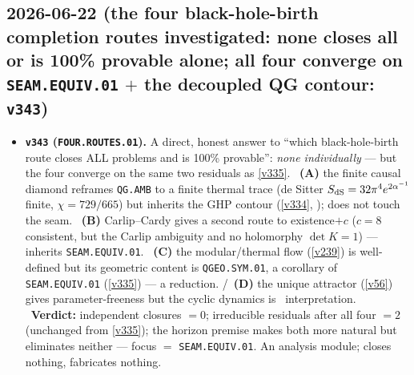 \subsection*{2026-06-22 (the four black-hole-birth completion routes investigated: none closes all or is 100\% provable alone; all four converge on \texttt{SEAM.EQUIV.01} $+$ the decoupled QG contour: \texttt{v343})}
\begin{itemize}
\item \textbf{\texttt{v343} (\texttt{FOUR.ROUTES.01}).} A direct, honest answer to ``which black-hole-birth route
closes ALL problems and is 100\% provable'': \emph{none individually} --- but the four converge on the same two
residuals as \vref{v335}. \mE\ \textbf{(A)} the finite causal diamond reframes \texttt{QG.AMB} to a finite thermal
trace (de Sitter $S_{\mathrm{dS}}=32\pi^4 e^{2\alpha^{-1}}$ finite, $\chi=729/665$) but inherits the GHP contour
(\vref{v334}, \mO); does not touch the seam. \mC\ \textbf{(B)} Carlip--Cardy gives a second route to existence$+c$
($c{=}8$ consistent, but the Carlip ambiguity and no holomorphy $\det K{=}1$) --- inherits \texttt{SEAM.EQUIV.01}.
\mE\ \textbf{(C)} the modular/thermal flow (\vref{v239}) is well-defined but its geometric content is
\texttt{QGEO.SYM.01}, a corollary of \texttt{SEAM.EQUIV.01} (\vref{v335}) --- a reduction. \mE/\mO\ \textbf{(D)} the
unique attractor (\vref{v56}) gives parameter-freeness but the cyclic dynamics is \mC\ interpretation. \mE\
\textbf{Verdict:} independent closures $=0$; irreducible residuals after all four $=2$ (unchanged from \vref{v335});
the horizon premise makes both more natural but eliminates neither --- focus $=$ \texttt{SEAM.EQUIV.01}. An analysis
module; closes nothing, fabricates nothing.
\end{itemize}

